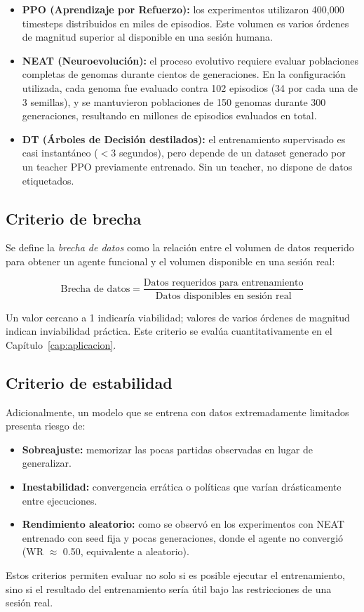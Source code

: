 \begin{itemize}
    \item \textbf{PPO (Aprendizaje por Refuerzo):} los experimentos utilizaron 400,000 timesteps distribuidos en miles de episodios. Este volumen es varios órdenes de magnitud superior al disponible en una sesión humana.
    \item \textbf{NEAT (Neuroevolución):} el proceso evolutivo requiere evaluar poblaciones completas de genomas durante cientos de generaciones. En la configuración utilizada, cada genoma fue evaluado contra 102 episodios (34 por cada una de 3 semillas), y se mantuvieron poblaciones de 150 genomas durante 300 generaciones, resultando en millones de episodios evaluados en total.
    \item \textbf{DT (Árboles de Decisión destilados):} el entrenamiento supervisado es casi instantáneo ($<$3 segundos), pero depende de un dataset generado por un teacher PPO previamente entrenado. Sin un teacher, no dispone de datos etiquetados.
\end{itemize}

\subsection{Criterio de brecha}

Se define la \textit{brecha de datos} como la relación entre el volumen de datos requerido para obtener un agente funcional y el volumen disponible en una sesión real:

\[
\text{Brecha de datos} = \frac{\text{Datos requeridos para entrenamiento}}{\text{Datos disponibles en sesión real}}
\]

Un valor cercano a 1 indicaría viabilidad; valores de varios órdenes de magnitud indican inviabilidad práctica. Este criterio se evalúa cuantitativamente en el Capítulo~\ref{cap:aplicacion}.

\subsection{Criterio de estabilidad}

Adicionalmente, un modelo que se entrena con datos extremadamente limitados presenta riesgo de:

\begin{itemize}
    \item \textbf{Sobreajuste:} memorizar las pocas partidas observadas en lugar de generalizar.
    \item \textbf{Inestabilidad:} convergencia errática o políticas que varían drásticamente entre ejecuciones.
    \item \textbf{Rendimiento aleatorio:} como se observó en los experimentos con NEAT entrenado con seed fija y pocas generaciones, donde el agente no convergió (WR $\approx$ 0.50, equivalente a aleatorio).
\end{itemize}

Estos criterios permiten evaluar no solo si es posible ejecutar el entrenamiento, sino si el resultado del entrenamiento sería útil bajo las restricciones de una sesión real.

